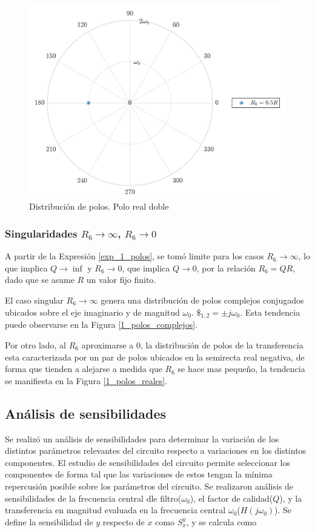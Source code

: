 \begin{figure}[ht]
\centering
\includegraphics[scale=0.5]{../parte1/informe/resources/1_polo_doble}
\caption{Distribución de polos. Polo real doble}
\label{1_polo_doble}
\end{figure}

\subsubsection{Singularidades $R_6 \rightarrow \infty$, $R_6 \rightarrow 0$}
A partir de la Expresión \ref{exp_1_polos}, se tomó limite para los casos $R_6 \rightarrow \infty$, lo que implica $Q \rightarrow \inf$ y $R_6 \rightarrow 0$, que implica $Q \rightarrow 0$, por la relación $R_6 = QR$, dado que se asume $R$ un valor fijo finito. 

El caso singular $R_6 \rightarrow \infty$ genera una distribución de polos complejos conjugados ubicados sobre el eje imaginario y de magnitud $\omega_0$. $\$_{1,2} = \pm j\omega_0$. Esta tendencia puede observarse en la Figura \ref{1_polos_complejos}. 

Por otro lado, al $R_6$ aproximarse a 0, la distribución de polos de la transferencia esta caracterizada por un par de polos ubicados en la semirecta real negativa, de forma que tienden a alejarse a medida que $R_6$ se hace mas pequeño, la tendencia se manifiesta en la Figura \ref{1_polos_reales}.

\subsection{Análisis de sensibilidades}
Se realizó un análisis de sensibilidades para determinar la variación de los distintos parámetros relevantes del circuito respecto a variaciones en los distintos componentes. El estudio de sensibilidades del circuito permite seleccionar los componentes de forma tal que las variaciones de estos tengan la mínima repercusión posible sobre los parámetros del circuito. Se realizaron análisis de sensibilidades de la frecuencia central dle filtro($\omega_0$), el factor de calidad($Q$), y la transferencia en magnitud evaluada en la frecuencia central $\omega_0$($H(j\omega_0)$). Se define la sensibilidad de $y$ respecto de $x$ como $S_x^y$, y se calcula como

